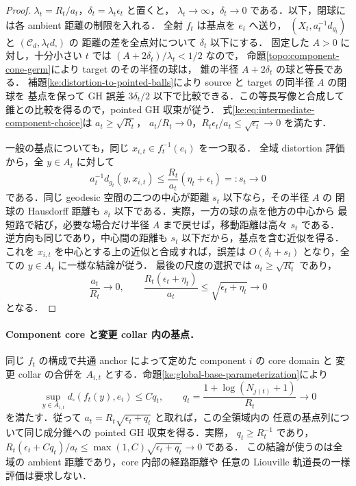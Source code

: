 \begin{proof}
$\lambda_t=R_t/a_t$，$\delta_t=\lambda_t\epsilon_t$ と置くと，
$\lambda_t\to\infty$，$\delta_t\to0$ である．以下，閉球には各 ambient 距離の制限を入れる．
全射 $f_t$ は基点を $e_i$ へ送り，
$(X_t,a_t^{-1}d_{g_t})$ と $(\mathcal C_d,\lambda_t d_\square)$ の
距離の差を全点対について $\delta_t$ 以下にする．
固定した $A>0$ に対し，十分小さい $t$ では $(A+2\delta_t)/\lambda_t<1/2$ なので，
命題\ref{topo:component-cone-germ}により target のその半径の球は，
錐の半径 $A+2\delta_t$ の球と等長である．
補題\ref{ke:distortion-to-pointed-balls}により source と target の同半径 $A$ の閉球を
基点を保って GH 誤差 $3\delta_t/2$ 以下で比較できる．この等長写像と合成して
錐との比較を得るので，pointed GH 収束が従う．
式\eqref{ke:eq:intermediate-component-choice}は $a_t\ge\sqrt{R_t}$，
$a_t/R_t\to0$，$R_t\epsilon_t/a_t\le\sqrt{\epsilon_t}\to0$ を満たす．

一般の基点についても，同じ $x_{i,t}\in f_t^{-1}(e_i)$ を一つ取る．
全域 distortion 評価から，全 $y\in A_t$ に対して
\[
 a_t^{-1}d_{g_t}(y,x_{i,t})
 \le\frac{R_t}{a_t}(\eta_t+\epsilon_t)=:s_t\longrightarrow0
\]
である．同じ geodesic 空間の二つの中心が距離 $s_t$ 以下なら，その半径 $A$ の
閉球の Hausdorff 距離も $s_t$ 以下である．実際，一方の球の点を他方の中心から
最短路で結び，必要な場合だけ半径 $A$ まで戻せば，移動距離は高々 $s_t$ である．
逆方向も同じであり，中心間の距離も $s_t$ 以下だから，基点を含む近似を得る．
これを $x_{i,t}$ を中心とする上の近似と合成すれば，誤差は
$O(\delta_t+s_t)$ となり，全ての $y\in A_t$ に一様な結論が従う．
最後の尺度の選択では $a_t\ge\sqrt{R_t}$ であり，
\[
 \frac{a_t}{R_t}\to0,\qquad
 \frac{R_t(\epsilon_t+\eta_t)}{a_t}
 \le\sqrt{\epsilon_t+\eta_t}\to0
\]
となる．
\end{proof}

\paragraph{Component core と変更 collar 内の基点．}
同じ $f_t$ の構成で共通 anchor によって定めた component $i$ の core domain と
変更 collar の合併を $A_{i,t}$ とする．命題\ref{ke:global-base-parameterization}により
\[
 \sup_{y\in A_{i,t}}d_\square(f_t(y),e_i)
 \le C q_t,\qquad
 q_t=\frac{1+\log(N_{j(t)}+1)}{R_t}\longrightarrow0
\]
を満たす．従って $a_t=R_t\sqrt{\epsilon_t+q_t}$ と取れば，この全領域内の
任意の基点列について同じ成分錐への pointed GH 収束を得る．実際，
$q_t\ge R_t^{-1}$ であり，
$R_t(\epsilon_t+Cq_t)/a_t\le\max(1,C)\sqrt{\epsilon_t+q_t}\to0$ である．
この結論が使うのは全域の ambient 距離であり，core 内部の経路距離や
任意の Liouville 軌道長の一様評価は要求しない．

